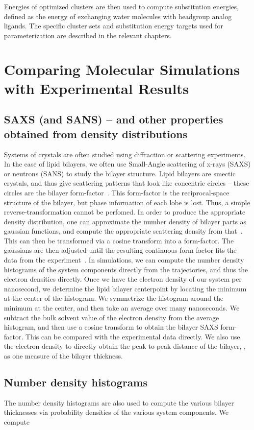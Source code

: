 Energies of optimized clusters are then used to compute substitution
energies, defined as the energy of exchanging water molecules
with headgroup analog ligands. The specific cluster sets and substitution
energy targets used for parameterization are described in the relevant
chapters.

\section{Comparing Molecular Simulations with Experimental Results}
\subsection{SAXS (and SANS) -- and other properties obtained from density distributions}
Systems of crystals are often studied using diffraction or scattering experiments. 
In the case of lipid bilayers, we often use Small-Angle scattering of x-rays (SAXS) or neutrons (SANS) 
to study the bilayer structure. Lipid bilayers are smectic crystals, and thus give scattering
patterns that look like concentric circles -- these circles are the bilayer form-factor~\cite{nagle:2000}. This form-factor
is the reciprocal-space structure of the bilayer, but phase information of each lobe is lost. 
Thus, a simple reverse-transformation cannot be perfomed.
In order to produce the appropriate density distribution, one can approximate the number density of bilayer parts as gaussian functions, and 
compute the appropriate scattering density from that~\cite{nagle:2000,fogarty:2015}. This can then be transformed via a cosine transform
into a form-factor. The gaussians are then adjusted
until the resulting continuous form-factor fits the data from the experiment~\cite{nagle:2000,fogarty:2015}.
In simulations, we can compute the number density histograms of the system components
directly from the trajectories, and thus the electron densities directly. Once we have the electron density of our system
per nanosecond, we determine the lipid bilayer centerpoint by locating the minimum at the center of the 
histogram. We symmetrize the histogram around the minimum at the center, and then take an average over many nanoseconds.
We subtract the bulk solvent value of the electron density from the average histogram, and then use a cosine transform
to obtain the bilayer SAXS form-factor. This can be compared with the experimental data directly.
We also use the electron density to directly obtain the peak-to-peak distance of the bilayer, \dhh{}, as one measure
of the bilayer thickness.
\subsection{Number density histograms}
The number density histograms are also used to compute the various bilayer thicknesses via probability densities
of the various system components. We compute 
